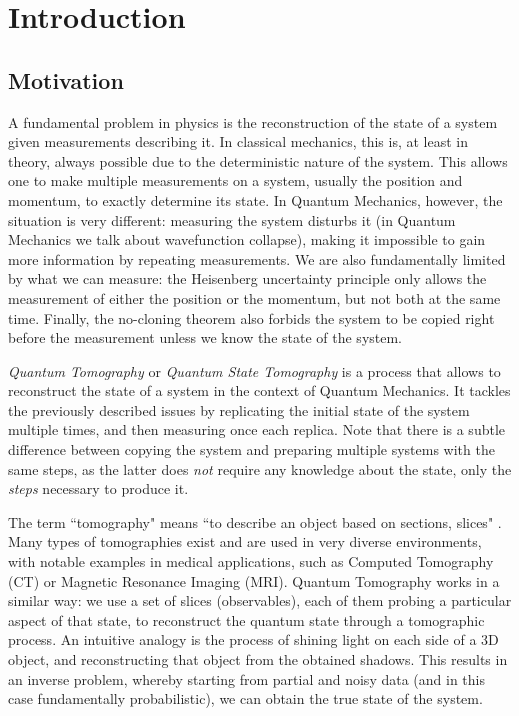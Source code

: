 \documentclass[12pt]{memoir}
\begin{document}
\chapter{Introduction}


\section{Motivation}


A fundamental problem in physics is the reconstruction of the state of a system given measurements describing it. In classical mechanics, this is, at least in theory, always possible due to the deterministic nature of the system. This allows one to make multiple measurements on a system, usually the position and momentum, to exactly determine its state. In Quantum Mechanics, however, the situation is very different: measuring the system disturbs it (in Quantum Mechanics we talk about wavefunction collapse), making it impossible to gain more information by repeating measurements. We are also fundamentally limited by what we can measure: the Heisenberg uncertainty principle only allows the measurement of either the position or the momentum, but not both at the same time. Finally, the no-cloning theorem also forbids the system to be copied right before the measurement unless we know the state of the system.\medbreak


\textit{Quantum Tomography} or \textit{Quantum State Tomography} is a process that allows to reconstruct the state of a system in the context of Quantum Mechanics. It tackles the previously described issues by replicating the initial state of the system multiple times, and then measuring once each replica. Note that there is a subtle difference between copying the system and preparing multiple systems with the same steps, as the latter does \textit{not} require any knowledge about the state, only the \textit{steps} necessary to produce it.\medbreak


The term ``tomography" means ``to describe an object based on sections, slices" \cite{wiki:tomography}. Many types of tomographies exist and are used in very diverse environments, with notable examples in medical applications, such as Computed Tomography (CT) or Magnetic Resonance Imaging (MRI). Quantum Tomography works in a similar way: we use a set of slices (observables), each of them probing a particular aspect of that state, to reconstruct the quantum state through a tomographic process. An intuitive analogy is the process of shining light on each side of a 3D object, and reconstructing that object from the obtained shadows. This results in an inverse problem, whereby starting from partial and noisy data (and in this case fundamentally probabilistic), we can obtain the true state of the system.
\end{document}
